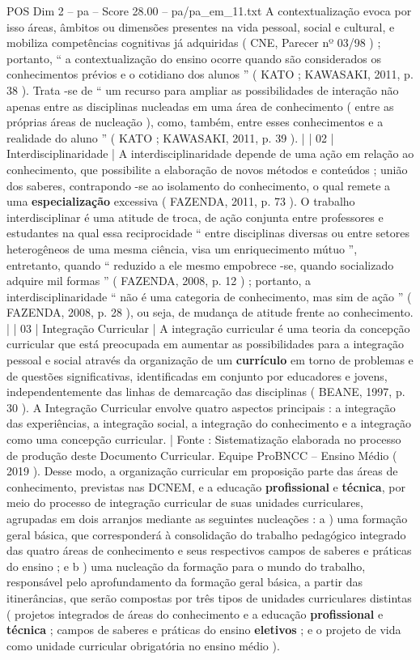 \begin{textsample}{POS Dim 2 – pa – Score 28.00 – pa/pa\_em\_11.txt}
A contextualização evoca por isso áreas, âmbitos ou dimensões presentes na vida pessoal, social e cultural, e mobiliza competências cognitivas já adquiridas ( CNE, Parecer nº 03/98 ) ; portanto, “ a contextualização do ensino ocorre quando são considerados os conhecimentos prévios e o cotidiano dos alunos ” ( KATO ; KAWASAKI, 2011, p. 38 ).
Trata -se de “ um recurso para ampliar as possibilidades de interação não apenas entre as disciplinas nucleadas em uma área de conhecimento ( entre as próprias áreas de nucleação ), como, também, entre esses conhecimentos e a realidade do aluno ” ( KATO ; KAWASAKI, 2011, p. 39 ). | | 02 | Interdisciplinaridade | A interdisciplinaridade depende de uma ação em relação ao conhecimento, que possibilite a elaboração de novos métodos e conteúdos ; união dos saberes, contrapondo -se ao isolamento do conhecimento, o qual remete a uma \textbf{especialização} excessiva ( FAZENDA, 2011, p. 73 ).
O trabalho interdisciplinar é uma atitude de troca, de ação conjunta entre professores e estudantes na qual essa reciprocidade “ entre disciplinas diversas ou entre setores heterogêneos de uma mesma ciência, visa um enriquecimento mútuo ”, entretanto, quando “ reduzido a ele mesmo empobrece -se, quando socializado adquire mil formas ” ( FAZENDA, 2008, p. 12 ) ; portanto, a interdisciplinaridade “ não é uma categoria de conhecimento, mas sim de ação ” ( FAZENDA, 2008, p. 28 ), ou seja, de mudança de atitude frente ao conhecimento. | | 03 | Integração Curricular | A integração curricular é uma teoria da concepção curricular que está preocupada em aumentar as possibilidades para a integração pessoal e social através da organização de um \textbf{currículo} em torno de problemas e de questões significativas, identificadas em conjunto por educadores e jovens, independentemente das linhas de demarcação das disciplinas ( BEANE, 1997, p. 30 ).
A Integração Curricular envolve quatro aspectos principais : a integração das experiências, a integração social, a integração do conhecimento e a integração como uma concepção curricular. | Fonte : Sistematização elaborada no processo de produção deste Documento Curricular.
Equipe ProBNCC – Ensino Médio ( 2019 ).
Desse modo, a organização curricular em proposição parte das áreas de conhecimento, previstas nas DCNEM, e a educação \textbf{profissional} e \textbf{técnica}, por meio do processo de integração curricular de suas unidades curriculares, agrupadas em dois arranjos mediante as seguintes nucleações : a ) uma formação geral básica, que corresponderá à consolidação do trabalho pedagógico integrado das quatro áreas de conhecimento e seus respectivos campos de saberes e práticas do ensino ; e b ) uma nucleação da formação para o mundo do trabalho, responsável pelo aprofundamento da formação geral básica, a partir das itinerâncias, que serão compostas por três tipos de unidades curriculares distintas ( projetos integrados de áreas do conhecimento e a educação \textbf{profissional} e \textbf{técnica} ; campos de saberes e práticas do ensino \textbf{eletivos} ; e o projeto de vida como unidade curricular obrigatória no ensino médio ).

\end{textsample}
